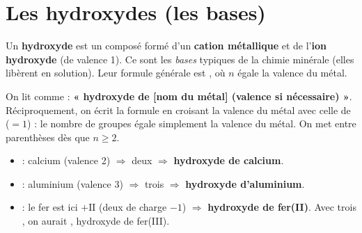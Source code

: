 \documentclass[11pt,a4paper]{article}
\begin{document}
\section{Les hydroxydes (les bases)}
\begin{definition}[hydroxyde]
Un \textbf{hydroxyde} est un composé formé d'un \textbf{cation métallique} et de l'\textbf{ion hydroxyde}
 (de valence 1). Ce sont les \emph{bases} typiques de la chimie minérale (elles libèrent 
en solution). Leur formule générale est , où $n$ égale la valence du métal.
\end{definition}

\begin{regle}
On lit  comme : \textbf{« hydroxyde de [nom du métal] (valence si nécessaire) »}. \\
Réciproquement, on écrit la formule en croisant la valence du métal avec celle de  ($=1$) : le
nombre de groupes  égale simplement la valence du métal. On met  entre parenthèses dès que
$n \geq 2$.
\end{regle}

\begin{exemple}
\begin{itemize}[leftmargin=1.6em,topsep=2pt,itemsep=2pt]
  \item {} : calcium  (valence 2) $\Rightarrow$ deux  $\Rightarrow$
        \textbf{hydroxyde de calcium}.
  \item {} : aluminium  (valence 3) $\Rightarrow$ trois  $\Rightarrow$
        \textbf{hydroxyde d'aluminium}.
  \item {} : le fer est ici $+\mathrm{II}$ (deux  de charge $-1$) $\Rightarrow$
        \textbf{hydroxyde de fer(II)}. Avec trois , on aurait , hydroxyde de fer(III).
\end{itemize}
\end{exemple}
\end{document}
